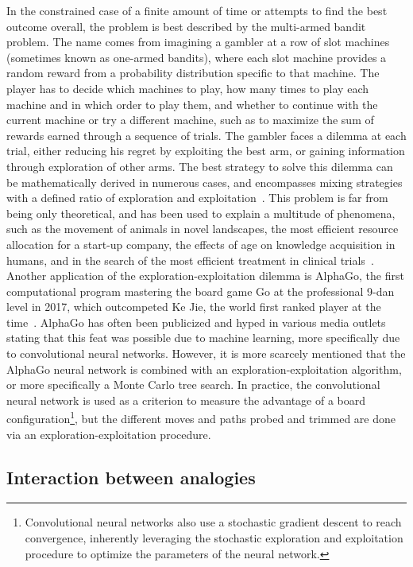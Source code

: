 In the constrained case of a finite amount of time or attempts to find the best outcome overall, the problem is best described by the multi-armed bandit problem.
The name comes from imagining a gambler at a row of slot machines (sometimes known as one-armed bandits), where each slot machine provides a random reward from a probability distribution specific to that machine. The player has to decide which machines to play, how many times to play each machine and in which order to play them, and whether to continue with the current machine or try a different machine, such as to maximize the sum of rewards earned through a sequence of trials.
The gambler faces a dilemma at each trial, either reducing his regret by exploiting the best arm, or gaining information through exploration of other arms.
The best strategy to solve this dilemma can be mathematically derived in numerous cases, and encompasses mixing strategies with a defined ratio of exploration and exploitation~\citep{Auer2002,Kocsis2006,Furnkranz2006}.
This problem is far from being only theoretical, and has been used to explain a multitude of phenomena, such as the movement of animals in novel landscapes, the most efficient resource allocation for a start-up company, the effects of age on knowledge acquisition in humans, and in the search of the most efficient treatment in clinical trials~\citep{Berger-Tal2014, March}.
Another application of the exploration-exploitation dilemma is AlphaGo, the first computational program mastering the board game Go at the professional 9-dan level in 2017, which outcompeted Ke Jie, the world first ranked player at the time~\citep{Silver2017, Silver2018}.
AlphaGo has often been publicized and hyped in various media outlets stating that this feat was possible due to machine learning, more specifically due to convolutional neural networks.
However, it is more scarcely mentioned that the AlphaGo neural network is combined with an exploration-exploitation algorithm, or more specifically a Monte Carlo tree search.
In practice, the convolutional neural network is used as a criterion to measure the advantage of a board configuration\footnote{Convolutional neural networks also use a stochastic gradient descent to reach convergence, inherently leveraging the stochastic exploration and exploitation procedure to optimize the parameters of the neural network.}, but the different moves and paths probed and trimmed are done via an exploration-exploitation procedure.

\subsection{Interaction between analogies}

